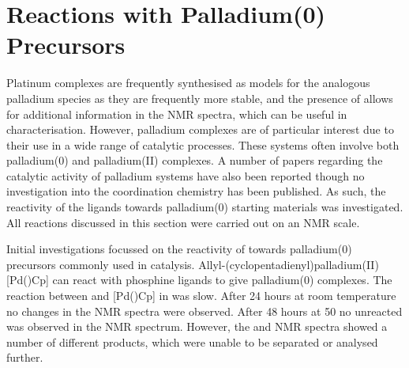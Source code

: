 %
%
%
%
%
%




\section{Reactions with Palladium(0) Precursors}

Platinum complexes are frequently synthesised as models for the analogous palladium species as they are frequently more stable, and the presence of \Pt{} allows for additional information in the NMR spectra, which can be useful in characterisation.  However, palladium complexes are of particular interest due to their use in a wide range of catalytic processes.  These systems often involve both palladium(0) and palladium(II) complexes.  A number of papers regarding the catalytic activity of palladium \tBuxantphos{} systems have also been reported though no investigation into the coordination chemistry has been published.  As such, the reactivity of the \tBuxantphos{} ligands towards palladium(0) starting materials was investigated.  All reactions discussed in this section were carried out on an NMR scale.  

Initial investigations focussed on the reactivity of \tButhixantphos{} towards palladium(0) precursors commonly used in catalysis.  Allyl-(cyclo\-pentadienyl)\-pal\-ladium(II) [Pd()Cp] can react with phosphine ligands to give palladium(0) complexes. The reaction between \tButhixantphos{} and [Pd()Cp] in  was slow.  After 24 hours at room temperature no changes in the NMR spectra were observed.  After 48 hours at 50 \degC{} no unreacted \tButhixantphos{} was observed in the \phosphorus{} NMR spectrum.  However, the \phosphorus{} and \proton{} NMR spectra showed a number of different products, which were unable to be separated or analysed further.


